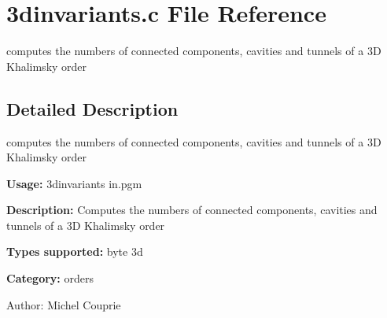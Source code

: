 \section{3dinvariants.c File Reference}
\label{3dinvariants_8c}
computes the numbers of connected components, cavities and tunnels of a 3D Khalimsky order  




\label{_details}
\subsection{Detailed Description}
computes the numbers of connected components, cavities and tunnels of a 3D Khalimsky order 

{\bf Usage:} 3dinvariants in.pgm

{\bf Description:} Computes the numbers of connected components, cavities and tunnels of a 3D Khalimsky order

{\bf Types supported:} byte 3d

{\bf Category:} orders

\begin{Desc}
\item[Author:]Michel Couprie \end{Desc}
